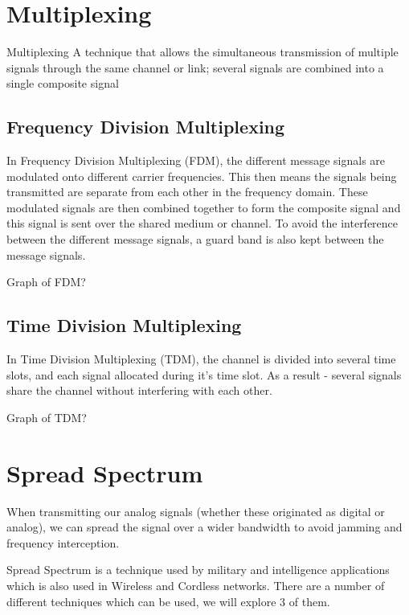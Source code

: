 \section{Multiplexing}
\begin{define}
\item[Multiplexing] A technique that allows the simultaneous transmission of multiple signals through the same channel or link; several signals are combined into a single composite signal
\end{define}

\subsection{Frequency Division Multiplexing}
In Frequency Division Multiplexing (FDM), the different message signals are modulated onto different carrier frequencies. This then means the signals being transmitted are separate from each other in the frequency domain. These modulated signals are then combined together to form the composite signal and this signal is sent over the shared medium or channel. To avoid the interference between the different message signals, a guard band is also kept between the message signals.
\begin{todo}
Graph of FDM?
\end{todo}

\subsection{Time Division Multiplexing}
In Time Division Multiplexing (TDM), the channel is divided into several time slots, and each signal allocated during it's time slot. As a result - several signals share the channel without interfering with each other. 
\begin{todo}
Graph of TDM?
\end{todo}

\section{Spread Spectrum}
When transmitting our analog signals (whether these originated as digital or analog), we can spread the signal over a wider bandwidth to avoid jamming and frequency interception. 

Spread Spectrum is a technique used by military and intelligence applications which is also used in Wireless and Cordless networks. There are a number of different techniques which can be used, we will explore 3 of them. 

